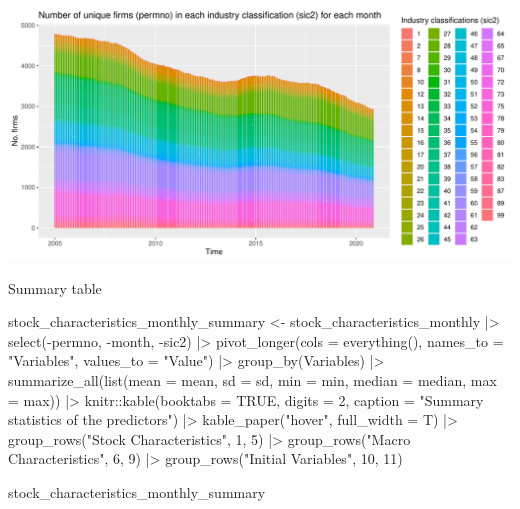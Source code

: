 \documentclass[
]{article}
\newenvironment{Shaded}{\begin{snugshade}}{\end{snugshade}}
\newcommand{\AttributeTok}[1]{\textcolor[rgb]{0.77,0.63,0.00}{#1}}
\newcommand{\ConstantTok}[1]{\textcolor[rgb]{0.00,0.00,0.00}{#1}}
\newcommand{\DecValTok}[1]{\textcolor[rgb]{0.00,0.00,0.81}{#1}}
\newcommand{\FunctionTok}[1]{\textcolor[rgb]{0.00,0.00,0.00}{#1}}
\newcommand{\NormalTok}[1]{#1}
\newcommand{\OtherTok}[1]{\textcolor[rgb]{0.56,0.35,0.01}{#1}}
\newcommand{\SpecialCharTok}[1]{\textcolor[rgb]{0.00,0.00,0.00}{#1}}
\newcommand{\StringTok}[1]{\textcolor[rgb]{0.31,0.60,0.02}{#1}}
\begin{document}
\begin{center}\includegraphics{figure/graphics-unnamed-chunk-3-1} \end{center}

Summary table

\begin{Shaded}
\begin{Highlighting}[]
\NormalTok{stock\_characteristics\_monthly\_summary }\OtherTok{\textless{}{-}}\NormalTok{ stock\_characteristics\_monthly }\SpecialCharTok{|\textgreater{}}
  \FunctionTok{select}\NormalTok{(}\SpecialCharTok{{-}}\NormalTok{permno, }\SpecialCharTok{{-}}\NormalTok{month, }\SpecialCharTok{{-}}\NormalTok{sic2) }\SpecialCharTok{|\textgreater{}}
  \FunctionTok{pivot\_longer}\NormalTok{(}\AttributeTok{cols =} \FunctionTok{everything}\NormalTok{(), }\AttributeTok{names\_to =} \StringTok{"Variables"}\NormalTok{, }\AttributeTok{values\_to =} \StringTok{"Value"}\NormalTok{) }\SpecialCharTok{|\textgreater{}}
  \FunctionTok{group\_by}\NormalTok{(Variables) }\SpecialCharTok{|\textgreater{}}
  \FunctionTok{summarize\_all}\NormalTok{(}\FunctionTok{list}\NormalTok{(}\AttributeTok{mean =}\NormalTok{ mean, }
                     \AttributeTok{sd =}\NormalTok{ sd,}
                     \AttributeTok{min =}\NormalTok{ min,}
                     \AttributeTok{median =}\NormalTok{ median,}
                     \AttributeTok{max =}\NormalTok{ max)) }\SpecialCharTok{|\textgreater{}}
\NormalTok{  knitr}\SpecialCharTok{::}\FunctionTok{kable}\NormalTok{(}\AttributeTok{booktabs =} \ConstantTok{TRUE}\NormalTok{, }\AttributeTok{digits =} \DecValTok{2}\NormalTok{, }\AttributeTok{caption =} \StringTok{"Summary statistics of the predictors"}\NormalTok{) }\SpecialCharTok{|\textgreater{}} 
  \FunctionTok{kable\_paper}\NormalTok{(}\StringTok{"hover"}\NormalTok{, }\AttributeTok{full\_width =}\NormalTok{ T) }\SpecialCharTok{|\textgreater{}}  
  \FunctionTok{group\_rows}\NormalTok{(}\StringTok{"Stock Characteristics"}\NormalTok{, }\DecValTok{1}\NormalTok{, }\DecValTok{5}\NormalTok{) }\SpecialCharTok{|\textgreater{}} 
  \FunctionTok{group\_rows}\NormalTok{(}\StringTok{"Macro Characteristics"}\NormalTok{, }\DecValTok{6}\NormalTok{, }\DecValTok{9}\NormalTok{) }\SpecialCharTok{|\textgreater{}} 
  \FunctionTok{group\_rows}\NormalTok{(}\StringTok{"Initial Variables"}\NormalTok{, }\DecValTok{10}\NormalTok{, }\DecValTok{11}\NormalTok{)}

\NormalTok{stock\_characteristics\_monthly\_summary}
\end{Highlighting}
\end{Shaded}
\end{document}
